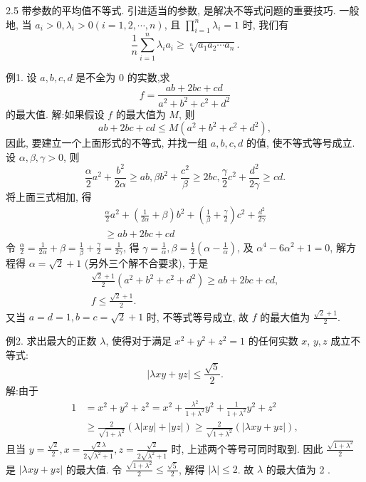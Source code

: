 
2.5 带参数的平均值不等式.
引进适当的参数, 是解决不等式问题的重要技巧.
一般地, 当 $a_i>0, \lambda_i>0(i=1,2, \cdots, n)$, 且 $\prod_{i=1}^n \lambda_i=1$ 时, 我们有
$$
\frac{1}{n} \sum_{i=1}^n \lambda_i a_i \geqslant \sqrt[n]{a_1 a_2 \cdots a_n} .
$$



例1. 设 $a, b, c, d$ 是不全为 0 的实数,求
$$
f=\frac{a b+2 b c+c d}{a^2+b^2+c^2+d^2}
$$
的最大值.
解:如果假设 $f$ 的最大值为 $M$, 则
$$
a b+2 b c+c d \leqslant M\left(a^2+b^2+c^2+d^2\right),
$$
因此, 要建立一个上面形式的不等式, 并找一组 $a, b, c, d$ 的值, 使不等式等号成立.
设 $\alpha, \beta, \gamma>0$, 则
$$
\frac{\alpha}{2} a^2+\frac{b^2}{2 \alpha} \geqslant a b, \beta b^2+\frac{c^2}{\beta} \geqslant 2 b c, \frac{\gamma}{2} c^2+\frac{d^2}{2 \gamma} \geqslant c d .
$$
将上面三式相加, 得
$$
\begin{gathered}
\frac{\alpha}{2} a^2+\left(\frac{1}{2 \alpha}+\beta\right) b^2+\left(\frac{1}{\beta}+\frac{\gamma}{2}\right) c^2+\frac{d^2}{2 \gamma} \\
\geqslant a b+2 b c+c d
\end{gathered}
$$
令 $\frac{\alpha}{2}=\frac{1}{2 \alpha}+\beta=\frac{1}{\beta}+\frac{\gamma}{2}=\frac{1}{2 \gamma}$, 得 $\gamma=\frac{1}{\alpha}, \beta=\frac{1}{2}\left(\alpha-\frac{1}{\alpha}\right)$, 及 $\alpha^4- 6 \alpha^2+1=0$, 解方程得 $\alpha=\sqrt{2}+1$ (另外三个解不合要求), 于是
$$
\begin{gathered}
\frac{\sqrt{2}+1}{2}\left(a^2+b^2+c^2+d^2\right) \geqslant a b+2 b c+c d, \\
f \leqslant \frac{\sqrt{2}+1}{2} .
\end{gathered}
$$
又当 $a=d=1, b=c=\sqrt{2}+1$ 时, 不等式等号成立, 故 $f$ 的最大值为 $\frac{\sqrt{2}+1}{2}$.



例2. 求出最大的正数 $\lambda$, 使得对于满足 $x^2+y^2+z^2=1$ 的任何实数 $x$, $y, z$ 成立不等式:
$$
|\lambda x y+y z| \leqslant \frac{\sqrt{5}}{2} .
$$
解:由于
$$
\begin{aligned}
1 & =x^2+y^2+z^2=x^2+\frac{\lambda^2}{1+\lambda^2} y^2+\frac{1}{1+\lambda^2} y^2+z^2 \\
& \geqslant \frac{2}{\sqrt{1+\lambda^2}}(\lambda|x y|+|y z|) \geqslant \frac{2}{\sqrt{1+\lambda^2}}(|\lambda x y+y z|),
\end{aligned}
$$
且当 $y=\frac{\sqrt{2}}{2}, x=\frac{\sqrt{2} \lambda}{2 \sqrt{\lambda^2+1}}, z=\frac{\sqrt{2}}{2 \sqrt{\lambda^2+1}}$ 时, 上述两个等号可同时取到.
因此 $\frac{\sqrt{1+\lambda^2}}{2}$ 是 $|\lambda x y+y z|$ 的最大值.
令 $\frac{\sqrt{1+\lambda^2}}{2} \leqslant \frac{\sqrt{5}}{2}$, 解得 $|\lambda| \leqslant 2$.
故 $\lambda$ 的最大值为 2 .



